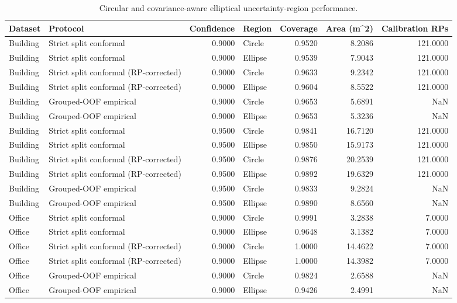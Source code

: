 \begin{table}
\caption{Circular and covariance-aware elliptical uncertainty-region performance.}
\label{tab:uncertainty}
\begin{tabular}{llrlrrr}
\toprule
Dataset & Protocol & Confidence & Region & Coverage & Area (m\textasciicircum 2) & Calibration RPs \\
\midrule
Building & Strict split conformal & 0.9000 & Circle & 0.9520 & 8.2086 & 121.0000 \\
Building & Strict split conformal & 0.9000 & Ellipse & 0.9539 & 7.9043 & 121.0000 \\
Building & Strict split conformal (RP-corrected) & 0.9000 & Circle & 0.9633 & 9.2342 & 121.0000 \\
Building & Strict split conformal (RP-corrected) & 0.9000 & Ellipse & 0.9604 & 8.5522 & 121.0000 \\
Building & Grouped-OOF empirical & 0.9000 & Circle & 0.9653 & 5.6891 & NaN \\
Building & Grouped-OOF empirical & 0.9000 & Ellipse & 0.9653 & 5.3236 & NaN \\
Building & Strict split conformal & 0.9500 & Circle & 0.9841 & 16.7120 & 121.0000 \\
Building & Strict split conformal & 0.9500 & Ellipse & 0.9850 & 15.9173 & 121.0000 \\
Building & Strict split conformal (RP-corrected) & 0.9500 & Circle & 0.9876 & 20.2539 & 121.0000 \\
Building & Strict split conformal (RP-corrected) & 0.9500 & Ellipse & 0.9892 & 19.6329 & 121.0000 \\
Building & Grouped-OOF empirical & 0.9500 & Circle & 0.9833 & 9.2824 & NaN \\
Building & Grouped-OOF empirical & 0.9500 & Ellipse & 0.9890 & 8.6560 & NaN \\
Office & Strict split conformal & 0.9000 & Circle & 0.9991 & 3.2838 & 7.0000 \\
Office & Strict split conformal & 0.9000 & Ellipse & 0.9648 & 3.1382 & 7.0000 \\
Office & Strict split conformal (RP-corrected) & 0.9000 & Circle & 1.0000 & 14.4622 & 7.0000 \\
Office & Strict split conformal (RP-corrected) & 0.9000 & Ellipse & 1.0000 & 14.3982 & 7.0000 \\
Office & Grouped-OOF empirical & 0.9000 & Circle & 0.9824 & 2.6588 & NaN \\
Office & Grouped-OOF empirical & 0.9000 & Ellipse & 0.9426 & 2.4991 & NaN \\

\end{tabular}
\end{table}
